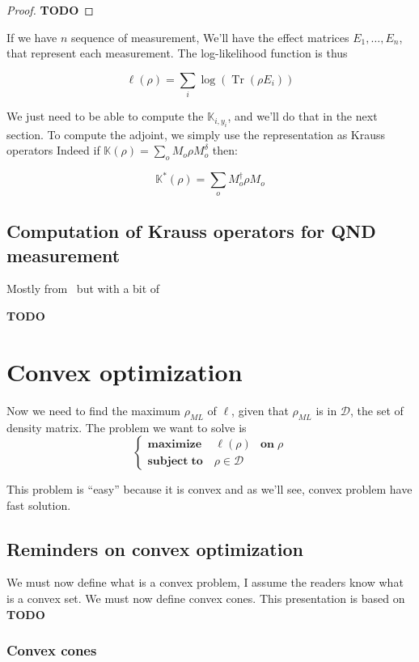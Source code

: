 \documentclass[10pt]{report}
\theoremstyle{plain}
\theoremstyle{definition}
\theoremstyle{remark}
\newcommand{\TODO}{\textbf{TODO}}
\DeclareMathOperator{\Tr}{Tr}
\newcommand{\ml}{_{M\!L}}
\newcommand{\maxim}[3]{\begin{cases}
    \mathbf{maximize}\,\quad #1& \mathbf{on}\; #2\\
    \mathbf{subject\;to}\quad #3
  \end{cases}}
\begin{document}
\begin{proof}
  \TODO{}
\end{proof}


If we have $n$ sequence of measurement, We'll have the effect
matrices $E_1, \ldots, E_n$, that represent each measurement. The log-likelihood
function is thus

\begin{equation}\label{eqn:ll}
  \ell(\rho) = \sum_i \log (\Tr(\rho E_i))
\end{equation}

We just need to be able to compute the $\mathbb K_{i,y_i}$, and we'll do that in
the next section. To compute the adjoint, we simply use the representation as
Krauss operators Indeed if $\mathbb K(\rho) = \sum\limits_o M_o\rho M_o^\delta$
then:

\[\mathbb K^*(\rho) = \sum_o M_o^\dagger \rho M_o\]

\section{Computation of Krauss operators for QND measurement}

Mostly from~\cite{VM19} but with a bit of~\cite{Har06}

\TODO{}

\chapter{Convex optimization}

Now we need to find the maximum $\rho\ml$ of $\ell$, given that $\rho\ml$ is in
$\mathcal{D}$, the set of density matrix. The problem we want to solve is
\[\maxim {\ell(\rho)} \rho {\rho \in \mathcal{D}}\]

This problem is ``easy'' because it is convex and as we'll see, convex problem
have fast solution.

\section{Reminders on convex optimization}

We must now define what is a convex problem, I assume the readers know what is a
convex set. We must now define convex cones. This presentation is based on \TODO{}

\subsection{Convex cones}
\end{document}

